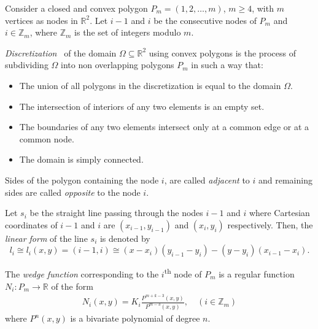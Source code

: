 \documentclass[automatic-bibliography]{univsciauth}
\begin{document}
Consider a closed and convex polygon $P_m = (1,2,\ldots,m)$, $m \geq 4$, with
$m$ vertices as nodes in $\mathbb{R}^2$. Let $i-1$ and $i$ be the consecutive
nodes of $P_m$ and $i \in \mathbb{Z}_m$, where $\mathbb{Z}_m$ is the set of
integers modulo $m$.

\begin{definition}
  \emph{Discretization}~\cite{phi} of the domain
  $\Omega \subseteq \mathbb{R}^2$ using convex polygons is the process of
  subdividing $\Omega$ into non overlapping polygons $P_m$ in such a way that:
        \begin{itemize}
          \item The union of all polygons in the discretization is equal
                to the domain $\Omega$.
          \item The intersection of interiors of any two elements is an empty
                set.
          \item The boundaries of any two elements intersect only at a
                common edge or at a common node.
          \item The domain is simply connected.
        \end{itemize}
\end{definition}

\begin{definition}
  Sides of the polygon containing the node $i$, are called \emph{adjacent}
  to $i$ and remaining sides are called \emph{opposite} to the node $i$.
\end{definition}

\begin{definition}
  Let $s_{i}$ be the straight line passing through the nodes $i-1$ and $i$
  where Cartesian coordinates of $i-1$ and $i$ are $(x_{i-1},y_{i-1})$ and
  $(x_i,y_i)$ respectively. Then, the \emph{linear form} of the line $s_i$ is
  denoted by
  \begin{equation}\label{r1}
    l_i\cong l_i(x,y)=(i-1,i)\cong (x-x_i)(y_{i-1}-y_i)-(y-y_i)(x_{i-1}-x_i).
  \end{equation}
\end{definition}

\begin{definition}
  The \emph{wedge function} corresponding to the $i$\textsuperscript{th} node of
  $P_m$ is a regular function $N_i: P_m \rightarrow \mathbb{R}$ of the form
  \begin{eqnarray}
    N_i(x,y)= K_i\frac{P^{m+k-3}(x,y)}{P^{m-3}(x,y)},\quad (i\in\mathbb{Z}_m)\label{eq1}
  \end{eqnarray}
  where $P^n(x,y)$ is a bivariate polynomial of degree $n$.
\end{definition}
\end{document}
